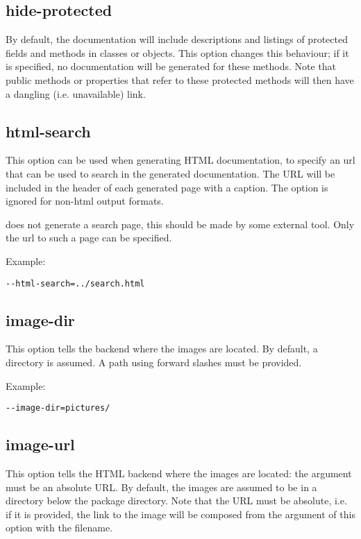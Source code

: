 \subsection{hide-protected}
\label{suse:hideprotected}
By default, the documentation will include descriptions and listings of
protected fields and methods in classes or objects. This option changes this
behaviour; if it is specified, no documentation will be generated for these
methods. Note that public methods or properties that refer to these
protected methods will then have a dangling (i.e. unavailable) link.

\subsection{html-search}
\label{suse:htmlsearch}
This option can be used when generating HTML documentation, to specify an
url that can be used to search in the generated documentation. The URL will be
included in the header of each generated page with a  caption.
The option is ignored for non-html output formats.

\fpdoc does not generate a search page, this should be made by some external
tool. Only the url to such a page can be specified.

Example:
\begin{verbatim}
--html-search=../search.html
\end{verbatim}

\subsection{image-dir}
\label{suse:imagedir}
This option tells the \latex backend where the images are located. By
default, a directory  is assumed. A path using forward
slashes must be provided.

Example:
\begin{verbatim}
--image-dir=pictures/
\end{verbatim}

\subsection{image-url}
\label{suse:imageurl}
This option tells the HTML backend where the images are located: the
argument must be an absolute URL. By default, the images are assumed to be
in a  directory below the package directory. Note that the URL 
must be absolute, i.e. if it is provided, the link to the image will be 
composed from the argument of this option with the filename.

